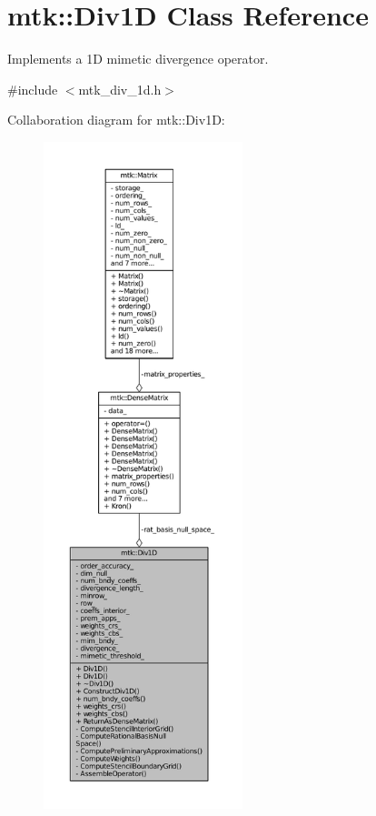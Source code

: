 \hypertarget{classmtk_1_1Div1D}{\section{mtk\-:\-:Div1\-D Class Reference}
\label{classmtk_1_1Div1D}
}


Implements a 1\-D mimetic divergence operator.  




{\ttfamily \#include $<$mtk\-\_\-div\-\_\-1d.\-h$>$}



Collaboration diagram for mtk\-:\-:Div1\-D\-:\nopagebreak
\begin{figure}[H]
\begin{center}
\leavevmode
\includegraphics[height=550pt]{classmtk_1_1Div1D__coll__graph}
\end{center}
\end{figure}
